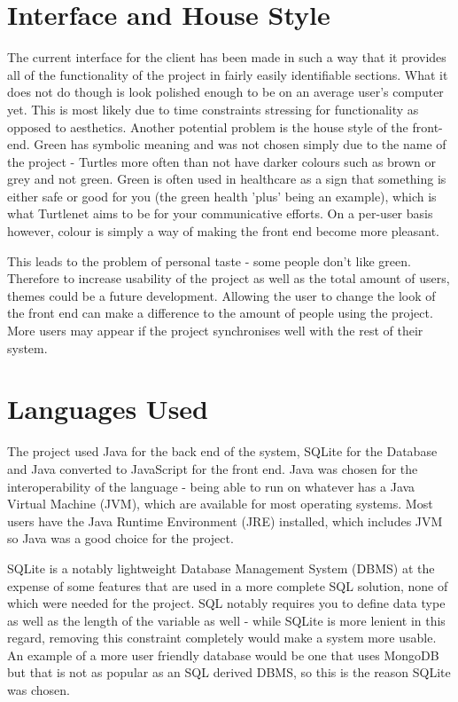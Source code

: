 \section{Interface and House Style}
The current interface for the client has been made in such a way that it
provides all of the functionality of the project in fairly easily identifiable
sections.  What it does not do though is look polished enough to be on an
average user's computer yet.  This is most likely due to time constraints
stressing for functionality as opposed to aesthetics.  Another potential problem
is the house style of the front-end.  Green has symbolic meaning and was not
chosen simply due to the name of the project - Turtles more often than not have
darker colours such as brown or grey and not green.  Green is often used in
healthcare as a sign that something is either safe or good for you (the green
health 'plus' being an example), which is what Turtlenet aims to be for your
communicative efforts.  On a per-user basis however, colour is simply a way of
making the front end become more pleasant.

This leads to the problem of personal taste - some people don't like green.
Therefore to increase usability of the project as well as the total amount of
users, themes could be a future development.  Allowing the user to change the
look of the front end can make a difference to the amount of people using the
project.  More users may appear if the project synchronises well with the rest
of their system.

\section{Languages Used}
The project used Java for the back end of the system, SQLite for the Database
and Java converted to JavaScript for the front end.  Java was chosen for the
interoperability of the language - being able to run on whatever has a Java
Virtual Machine (JVM), which are available for most operating systems.  Most
users have the Java Runtime Environment (JRE) installed, which includes JVM so
Java was a good choice for the project.

SQLite is a notably lightweight Database Management System (DBMS) at the expense
of some features that are used in a more complete SQL solution, none of which
were needed for the project.  SQL notably requires you to define data type as
well as the length of the variable as well - while SQLite is more lenient in
this regard, removing this constraint completely would make a system more
usable.  An example of a more user friendly database would be one that uses 
MongoDB but that is not as popular as an SQL derived DBMS, so this is the
reason SQLite was chosen.

